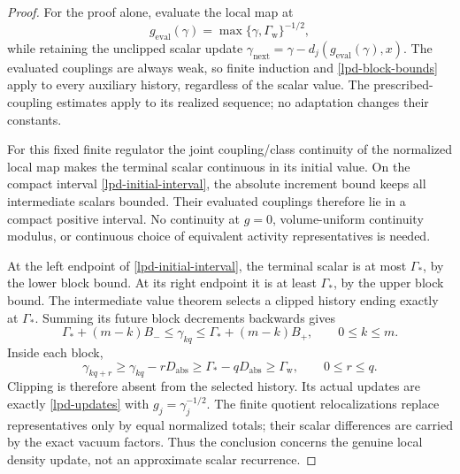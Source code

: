\documentclass[11pt]{article}
\theoremstyle{remark}
\begin{document}
\begin{proof}
For the proof alone, evaluate the local map at
\begin{equation}
 g_{\mathrm{eval}}(\gamma)
             =\max\{\gamma,\Gamma_{\mathrm w}\}^{-1/2},
 \label{lpd-clipped-coupling}
\end{equation}
while retaining the unclipped scalar update
\(\gamma_{\mathrm{next}}
 =\gamma-d_j(g_{\mathrm{eval}}(\gamma),x)\).
The evaluated couplings are always weak, so finite induction and
\eqref{lpd-block-bounds} apply to every auxiliary history, regardless
of the scalar value. The prescribed-coupling estimates apply to
its realized sequence; no adaptation changes their constants.

For this fixed finite regulator the joint coupling/class continuity
of the normalized local map makes the terminal scalar continuous
in its initial value. On the compact interval
\eqref{lpd-initial-interval}, the absolute increment bound keeps
all intermediate scalars bounded. Their evaluated couplings
therefore lie in a compact positive interval. No continuity at
\(g=0\), volume-uniform continuity modulus, or continuous choice
of equivalent activity representatives is needed.

At the left endpoint of \eqref{lpd-initial-interval}, the terminal
scalar is at most \(\Gamma_*\), by the lower block bound. At its
right endpoint it is at least \(\Gamma_*\), by the upper block
bound. The intermediate value theorem selects a clipped history
ending exactly at \(\Gamma_*\). Summing its future block decrements
backwards gives
\begin{equation}
 \Gamma_*+(m-k)B_-\le\gamma_{kq}
                   \le\Gamma_*+(m-k)B_+,
 \qquad 0\le k\le m.
 \label{lpd-block-endpoints}
\end{equation}
Inside each block,
\begin{equation}
 \gamma_{kq+r}\ge\gamma_{kq}-rD_{\mathrm{abs}}
       \ge\Gamma_*-qD_{\mathrm{abs}}
       \ge\Gamma_{\mathrm w},
 \qquad 0\le r\le q.
 \label{lpd-clipping-absent}
\end{equation}
Clipping is therefore absent from the selected history.
Its actual updates are exactly \eqref{lpd-updates} with
\(g_j=\gamma_j^{-1/2}\). The finite quotient relocalizations
replace representatives only by equal normalized totals; their
scalar differences are carried by the exact vacuum factors.
Thus the conclusion concerns the genuine local density update,
not an approximate scalar recurrence.
\end{proof}
\end{document}
